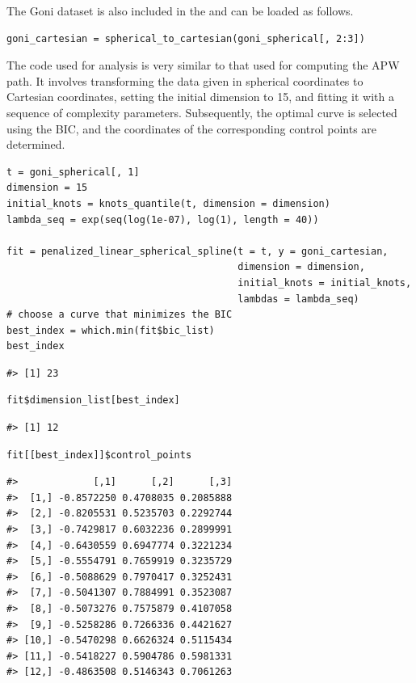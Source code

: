 The Goni dataset is also included in the  and can be loaded as follows.

\begin{verbatim}
goni_cartesian = spherical_to_cartesian(goni_spherical[, 2:3])
\end{verbatim}

The code used for analysis is very similar to that used for computing the APW path. It involves transforming the data given in spherical coordinates to Cartesian coordinates, setting the initial dimension to 15, and fitting it with a sequence of complexity parameters. Subsequently, the optimal curve is selected using the BIC, and the coordinates of the corresponding control points are determined.

\begin{verbatim}
t = goni_spherical[, 1]
dimension = 15
initial_knots = knots_quantile(t, dimension = dimension)
lambda_seq = exp(seq(log(1e-07), log(1), length = 40))

fit = penalized_linear_spherical_spline(t = t, y = goni_cartesian,
                                        dimension = dimension,
                                        initial_knots = initial_knots,
                                        lambdas = lambda_seq)
# choose a curve that minimizes the BIC
best_index = which.min(fit$bic_list)
best_index
\end{verbatim}

\begin{verbatim}
#> [1] 23
\end{verbatim}

\begin{verbatim}
fit$dimension_list[best_index]
\end{verbatim}

\begin{verbatim}
#> [1] 12
\end{verbatim}

\begin{verbatim}
fit[[best_index]]$control_points
\end{verbatim}

\begin{verbatim}
#>             [,1]      [,2]      [,3]
#>  [1,] -0.8572250 0.4708035 0.2085888
#>  [2,] -0.8205531 0.5235703 0.2292744
#>  [3,] -0.7429817 0.6032236 0.2899991
#>  [4,] -0.6430559 0.6947774 0.3221234
#>  [5,] -0.5554791 0.7659919 0.3235729
#>  [6,] -0.5088629 0.7970417 0.3252431
#>  [7,] -0.5041307 0.7884991 0.3523087
#>  [8,] -0.5073276 0.7575879 0.4107058
#>  [9,] -0.5258286 0.7266336 0.4421627
#> [10,] -0.5470298 0.6626324 0.5115434
#> [11,] -0.5418227 0.5904786 0.5981331
#> [12,] -0.4863508 0.5146343 0.7061263
\end{verbatim}

